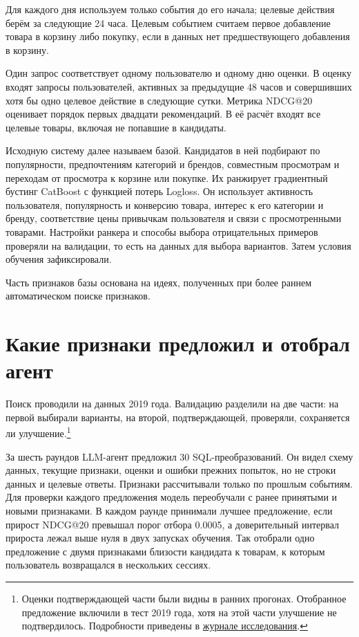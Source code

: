 \documentclass[11pt,a4paper]{article}
\begin{document}
Для каждого дня используем только события до его начала; целевые действия берём за следующие 24 часа. Целевым событием считаем первое добавление товара в корзину либо покупку, если в данных нет предшествующего добавления в корзину.

Один запрос соответствует одному пользователю и одному дню оценки. В оценку входят запросы пользователей, активных за предыдущие 48 часов и совершивших хотя бы одно целевое действие в следующие сутки. Метрика NDCG@20 оценивает порядок первых двадцати рекомендаций. В её расчёт входят все целевые товары, включая не попавшие в кандидаты.

Исходную систему далее называем базой. Кандидатов в ней подбирают по популярности, предпочтениям категорий и брендов, совместным просмотрам и переходам от просмотра к корзине или покупке. Их ранжирует градиентный бустинг CatBoost с функцией потерь Logloss. Он использует активность пользователя, популярность и конверсию товара, интерес к его категории и бренду, соответствие цены привычкам пользователя и связи с просмотренными товарами. Настройки ранкера и способы выбора отрицательных примеров проверяли на валидации, то есть на данных для выбора вариантов. Затем условия обучения зафиксировали.

Часть признаков базы основана на идеях, полученных при более раннем автоматическом поиске признаков.

\section{Какие признаки предложил и отобрал агент}
Поиск проводили на данных 2019 года. Валидацию разделили на две части: на первой выбирали варианты, на второй, подтверждающей, проверяли, сохраняется ли улучшение.\footnote{Оценки подтверждающей части были видны в ранних прогонах. Отобранное предложение включили в тест 2019 года, хотя на этой части улучшение не подтвердилось. Подробности приведены в \href{https://github.com/suprend/tlab-recsys-2026-task1/blob/main/docs/task1-v2-report.md}{журнале исследования}.}

За шесть раундов LLM-агент предложил 30 SQL-преобразований. Он видел схему данных, текущие признаки, оценки и ошибки прежних попыток, но не строки данных и целевые ответы. Признаки рассчитывали только по прошлым событиям. Для проверки каждого предложения модель переобучали с ранее принятыми и новыми признаками. В каждом раунде принимали лучшее предложение, если прирост NDCG@20 превышал порог отбора 0.0005, а доверительный интервал прироста лежал выше нуля в двух запусках обучения. Так отобрали одно предложение с двумя признаками близости кандидата к товарам, к которым пользователь возвращался в нескольких сессиях.
\end{document}
